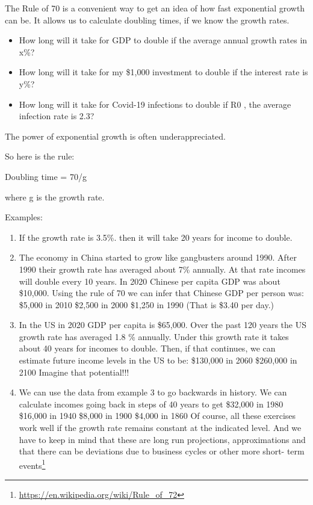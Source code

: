 \documentclass[
]{book}
\providecommand{\tightlist}{%
  \setlength{\itemsep}{0pt}\setlength{\parskip}{0pt}}
\begin{document}
The Rule of 70 is a convenient way to get an idea of how fast exponential growth can be. It allows us to calculate doubling times, if we know the growth rates.

\begin{itemize}
\tightlist
\item
  How long will it take for GDP to double if the average annual growth rates in x\%?
\item
  How long will it take for my \$1,000 investment to double if the interest rate is y\%?
\item
  How long will it take for Covid-19 infections to double if R0 , the average infection rate is 2.3?
\end{itemize}

The power of exponential growth is often underappreciated.

So here is the rule:

Doubling time = 70/g

where g is the growth rate.

Examples:

\begin{enumerate}
\def\labelenumi{\arabic{enumi}.}
\item
  If the growth rate is 3.5\%. then it will take 20 years for income to double.
\item
  The economy in China started to grow like gangbusters around 1990. After 1990 their growth rate has averaged about 7\% annually. At that rate incomes will double every 10 years. In 2020 Chinese per capita GDP was about \$10,000. Using the rule of 70 we can infer that Chinese GDP per person was:
  \$5,000 in 2010
  \$2,500 in 2000
  \$1,250 in 1990 (That is \$3.40 per day.)
\item
  In the US in 2020 GDP per capita is \$65,000. Over the past 120 years the US growth rate has averaged 1.8 \% annually. Under this growth rate it takes about 40 years for incomes to double. Then, if that continues, we can estimate future income levels in the US to be:
  \$130,000 in 2060
  \$260,000 in 2100
  Imagine that potential!!!
\item
  We can use the data from example 3 to go backwards in history. We can calculate incomes going back in steps of 40 years to get
  \$32,000 in 1980
  \$16,000 in 1940
  \$8,000 in 1900
  \$4,000 in 1860
  Of course, all these exercises work well if the growth rate remains constant at the indicated level. And we have to keep in mind that these are long run projections, approximations and that there can be deviations due to business cycles or other more short- term events\footnote{\url{https://en.wikipedia.org/wiki/Rule_of_72}}
\end{enumerate}
\end{document}
